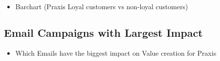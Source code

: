 \documentclass[
  10pt,
]{article}
\providecommand{\tightlist}{%
  \setlength{\itemsep}{0pt}\setlength{\parskip}{0pt}}
\begin{document}
\begin{itemize}
\tightlist
\item
  Barchart (Praxis Loyal customers vs non-loyal customers)
\end{itemize}

\hypertarget{email-campaigns-with-largest-impact-1}{%
\subsection{Email Campaigns with Largest
Impact}\label{email-campaigns-with-largest-impact-1}}

\begin{itemize}
\tightlist
\item
  Which Emails have the biggest impact on Value creation for Praxis
\end{itemize}
\end{document}
